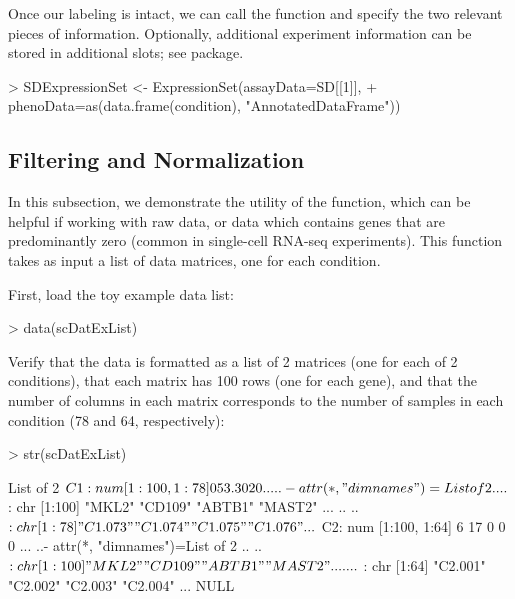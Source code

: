 \documentclass{article}
\begin{document}
Once our labeling is intact, we can call the  function and specify the two relevant pieces of information.  Optionally, additional experiment information can be stored in additional slots; see  package.
\begin{Schunk}
\begin{Sinput}
> SDExpressionSet <- ExpressionSet(assayData=SD[[1]], 
+                     phenoData=as(data.frame(condition), "AnnotatedDataFrame"))
\end{Sinput}
\end{Schunk}

\subsection{Filtering and Normalization}

In this subsection, we demonstrate the utility of the  function, which can be helpful if working with raw data, or data which contains genes that are predominantly zero (common in single-cell RNA-seq experiments).  This function takes as input a list of data matrices, one for each condition.

First, load the toy example data list:
\begin{Schunk}
\begin{Sinput}
> data(scDatExList)
\end{Sinput}
\end{Schunk}

Verify that the data is formatted as a list of 2 matrices (one for each of 2 conditions), that each matrix has 100 rows (one for each gene), and that the number of columns in each matrix corresponds to the number of samples in each condition (78 and 64, respectively):
\begin{Schunk}
\begin{Sinput}
> str(scDatExList)
\end{Sinput}
\begin{Soutput}
List of 2
 $ C1: num [1:100, 1:78] 0 53.3 0 2 0 ...
  ..- attr(*, "dimnames")=List of 2
  .. ..$ : chr [1:100] "MKL2" "CD109" "ABTB1" "MAST2" ...
  .. ..$ : chr [1:78] "C1.073" "C1.074" "C1.075" "C1.076" ...
 $ C2: num [1:100, 1:64] 6 17 0 0 0 ...
  ..- attr(*, "dimnames")=List of 2
  .. ..$ : chr [1:100] "MKL2" "CD109" "ABTB1" "MAST2" ...
  .. ..$ : chr [1:64] "C2.001" "C2.002" "C2.003" "C2.004" ...
NULL
\end{Soutput}
\end{Schunk}
\end{document}
